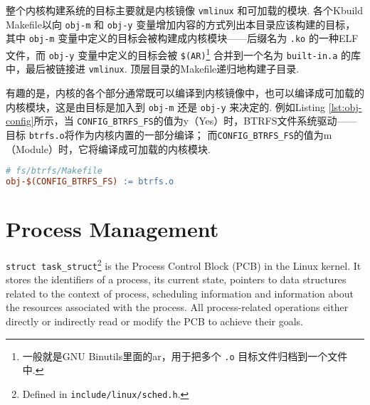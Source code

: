 \documentclass[11pt]{article}
\begin{document}
整个内核构建系统的目标主要就是内核镜像 \lstinline{vmlinux} 和可加载的模块.
各个Kbuild Makefile以向 \lstinline{obj-m} 和 \lstinline{obj-y} 变量增加内容的方式列出本目录应该构建的目标，
其中 \lstinline{obj-m} 变量中定义的目标会被构建成内核模块——后缀名为 \lstinline{.ko} 的一种ELF文件，而 \lstinline{obj-y} 变量中定义的目标会被 \lstinline{$(AR)}\footnote{一般就是GNU Binutils里面的ar，用于把多个 \lstinline{.o} 目标文件归档到一个文件中.} 合并到一个名为 \lstinline{built-in.a} 的库中，最后被链接进 \lstinline{vmlinux}.
顶层目录的Makefile递归地构建子目录.

有趣的是，内核的各个部分通常既可以编译到内核镜像中，也可以编译成可加载的内核模块，这是由目标是加入到 \lstinline{obj-m} 还是 \lstinline{obj-y} 来决定的.
例如Listing \ref{lst:obj-config}所示，当 \lstinline{CONFIG_BTRFS_FS}的值为y（Yes）时，BTRFS文件系统驱动——目标 \lstinline{btrfs.o}将作为内核内置的一部分编译；
而\lstinline{CONFIG_BTRFS_FS}的值为m（Module）时，它将编译成可加载的内核模块.

\begin{lstlisting}[language=make, caption=可配置的编译目标, label=lst:obj-config]
# fs/btrfs/Makefile
obj-$(CONFIG_BTRFS_FS) := btrfs.o
\end{lstlisting}

\section{Process Management}
\lstinline{struct task_struct}\footnote{Defined in \lstinline{include/linux/sched.h}.\label{sched.h}} is the Process Control Block (PCB) in the Linux kernel.
It stores the identifiers of a process, its current state, pointers to data structures related to the context of process, scheduling information and information about the resources associated with the process.
All process-related operations either directly or indirectly read or modify the PCB to achieve their goals.
\end{document}

